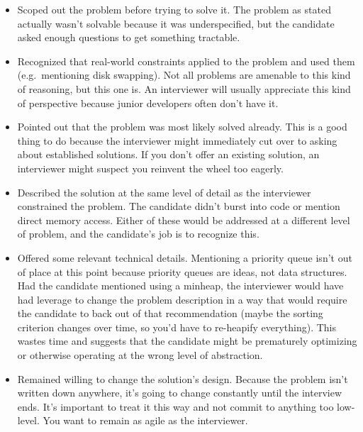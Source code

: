 \documentclass{article}
\begin{document}
\begin{itemize}
\item{Scoped out the problem before trying to solve it. The problem as}
  stated actually wasn't solvable because it was underspecified, but
  the candidate asked enough questions to get something tractable.

\item{Recognized that real-world constraints applied to the problem}
  and used them (e.g.~mentioning disk swapping). Not all problems are
  amenable to this kind of reasoning, but this one is. An interviewer
  will usually appreciate this kind of perspective because junior
  developers often don't have it.

\item{Pointed out that the problem was most likely solved already.}
  This is a good thing to do because the interviewer might immediately
  cut over to asking about established solutions. If you don't offer an
  existing solution, an interviewer might suspect you reinvent the
  wheel too eagerly.

\item{Described the solution at the same level of detail as the}
  interviewer constrained the problem. The candidate didn't burst into
  code or mention direct memory access. Either of these would be
  addressed at a different level of problem, and the candidate's job is
  to recognize this.

\item{Offered some relevant technical details. Mentioning a priority}
  queue isn't out of place at this point because priority queues are
  ideas, not data structures. Had the candidate mentioned using a
  minheap, the interviewer would have had leverage to change the
  problem description in a way that would require the candidate to back
  out of that recommendation (maybe the sorting criterion changes over
  time, so you'd have to re-heapify everything). This wastes time and
  suggests that the candidate might be prematurely optimizing or
  otherwise operating at the wrong level of abstraction.

\item{Remained willing to change the solution's design. Because the}
  problem isn't written down anywhere, it's going to change constantly
  until the interview ends. It's important to treat it this way and not
  commit to anything too low-level. You want to remain as agile as the
  interviewer.
\end{itemize}
\end{document}
